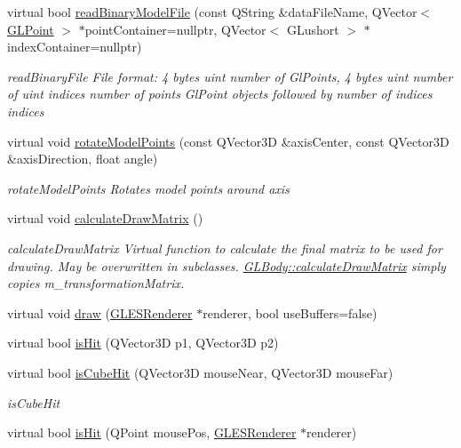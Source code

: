 \begin{DoxyCompactItemize}
virtual bool \mbox{\hyperlink{class_g_l_body_ad6f12ae3d48aa96561138a8c91fab68a}{read\+Binary\+Model\+File}} (const Q\+String \&data\+File\+Name, Q\+Vector$<$ \mbox{\hyperlink{class_g_l_point}{G\+L\+Point}} $>$ $\ast$point\+Container=nullptr, Q\+Vector$<$ G\+Lushort $>$ $\ast$index\+Container=nullptr)
\begin{DoxyCompactList}\small\item\em read\+Binary\+File File format\+: 4 bytes uint number of Gl\+Points, 4 bytes uint number of uint indices number of points Gl\+Point objects followed by number of indices indices \end{DoxyCompactList}\item 
virtual void \mbox{\hyperlink{class_g_l_body_a2bcb327029d699431bcb8ae51d3c57fb}{rotate\+Model\+Points}} (const Q\+Vector3D \&axis\+Center, const Q\+Vector3D \&axis\+Direction, float angle)
\begin{DoxyCompactList}\small\item\em rotate\+Model\+Points Rotates model points around axis \end{DoxyCompactList}\item 
virtual void \mbox{\hyperlink{class_g_l_body_af69c1be811d9da78c2cf9d65deb83b5d}{calculate\+Draw\+Matrix}} ()
\begin{DoxyCompactList}\small\item\em calculate\+Draw\+Matrix Virtual function to calculate the final matrix to be used for drawing. May be overwritten in subclasses. \mbox{\hyperlink{class_g_l_body_af69c1be811d9da78c2cf9d65deb83b5d}{G\+L\+Body\+::calculate\+Draw\+Matrix}} simply copies m\+\_\+transformation\+Matrix. \end{DoxyCompactList}\item 
virtual void \mbox{\hyperlink{class_g_l_body_aaeb47c0a8cfc36caed81fc139c42ddfc}{draw}} (\mbox{\hyperlink{class_g_l_e_s_renderer}{G\+L\+E\+S\+Renderer}} $\ast$renderer, bool use\+Buffers=false)
\item 
virtual bool \mbox{\hyperlink{class_g_l_body_abe64b649f2b2ec09b2876d6382258e13}{is\+Hit}} (Q\+Vector3D p1, Q\+Vector3D p2)
\item 
virtual bool \mbox{\hyperlink{class_g_l_body_a565ad6592f00bd28942408a1a8ecd669}{is\+Cube\+Hit}} (Q\+Vector3D mouse\+Near, Q\+Vector3D mouse\+Far)
\begin{DoxyCompactList}\small\item\em is\+Cube\+Hit \end{DoxyCompactList}\item 
virtual bool \mbox{\hyperlink{class_g_l_body_ad6855369ac46247ffe0709731e889d23}{is\+Hit}} (Q\+Point mouse\+Pos, \mbox{\hyperlink{class_g_l_e_s_renderer}{G\+L\+E\+S\+Renderer}} $\ast$renderer)

\end{DoxyCompactItemize}
